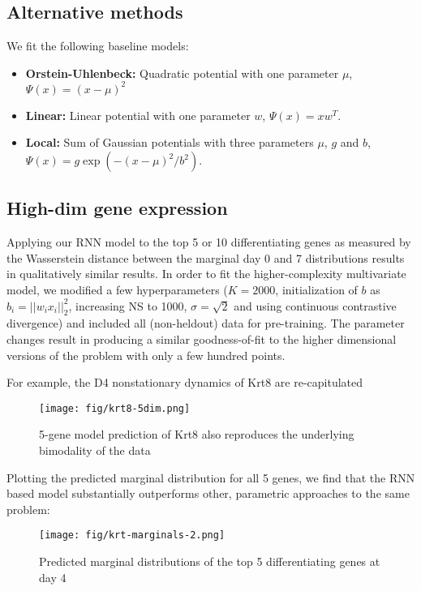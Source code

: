 \documentclass{article}
\begin{document}
\subsection{Alternative methods} \label{sec:altmethods}
We fit the following baseline models:
\begin{itemize}
\item \textbf{Orstein-Uhlenbeck:} Quadratic potential with one parameter $\mu$, $\Psi(x) = (x-\mu)^2$
\item \textbf{Linear:} Linear potential with one parameter $w$, $\Psi(x) = xw^T$.
\item \textbf{Local:} Sum of Gaussian potentials with three parameters $\mu$, $g$ and $b$, $\Psi(x) = g\exp(-(x-\mu)^2/b^2)$.
\end{itemize}


\subsection{High-dim gene expression}

Applying our RNN model to the top 5 or 10 differentiating genes as measured by the Wasserstein distance between the marginal day 0 and 7 distributions results in qualitatively similar results. In order to fit the higher-complexity multivariate model, we modified a few hyperparameters ($K=2000$, initialization of $b$ as $b_i = ||w_i x_i||_2^2$, increasing NS to 1000, $\sigma=\sqrt{2}$ and using continuous contrastive divergence) and included all (non-heldout) data for pre-training. The parameter changes result in producing a similar goodness-of-fit to the higher dimensional versions of the problem with only a few hundred points.

For example, the D4 nonstationary dynamics of Krt8 are re-capitulated
\begin{figure}[h]
\centering
\texttt{[image: fig/krt8-5dim.png]}
\caption{5-gene model prediction of Krt8 also reproduces the underlying bimodality of the data}
\label{fig:5dkrt}
\end{figure}

Plotting the predicted marginal distribution for all 5 genes, we find that the RNN based model substantially outperforms other, parametric approaches to the same problem:
\begin{figure}[h]
\texttt{[image: fig/krt-marginals-2.png]}
\caption{Predicted marginal distributions of the top 5 differentiating genes at day 4}
\label{fig:5dmarg}
\end{figure}
\end{document}
